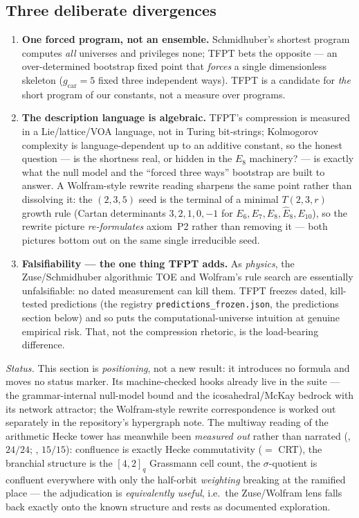 \documentclass[11pt,a4paper]{article}
\begin{document}
\subsection*{Three deliberate divergences}
\begin{enumerate}[leftmargin=1.6em,itemsep=2pt,topsep=2pt,label=\textbf{(\Alph*)}]
\item \textbf{One forced program, not an ensemble.} Schmidhuber's shortest program
      computes \emph{all} universes and privileges none; TFPT bets the opposite --- an
      over-determined bootstrap fixed point that \emph{forces} a single dimensionless
      skeleton ($g_{\mathrm{car}}{=}5$ fixed three independent ways). TFPT is a candidate
      for \emph{the} short program of our constants, not a measure over programs.
\item \textbf{The description language is algebraic.} TFPT's compression is measured in a
      Lie/lattice/VOA language, not in Turing bit-strings; Kolmogorov complexity is
      language-dependent up to an additive constant, so the honest question --- is the
      shortness real, or hidden in the $E_8$ machinery? --- is exactly what the null model
      and the ``forced three ways'' bootstrap are built to answer. A Wolfram-style rewrite
      reading sharpens the same point rather than dissolving it: the $(2,3,5)$ seed is the
      terminal of a minimal $T(2,3,r)$ growth rule (Cartan determinants $3,2,1,0,-1$ for
      $E_6,E_7,E_8,\hat E_8,E_{10}$), so the rewrite picture \emph{re-formulates}
      axiom~P2 rather than removing it --- both pictures bottom out on the same single
      irreducible seed.
\item \textbf{Falsifiability --- the one thing TFPT adds.} As \emph{physics}, the
      Zuse/Schmidhuber algorithmic TOE and Wolfram's rule search are essentially
      unfalsifiable: no dated measurement can kill them. TFPT freezes dated, kill-tested
      predictions (the registry \texttt{predictions\_frozen.json}, the predictions section
      below) and so puts the computational-universe intuition at genuine empirical risk.
      That, not the compression rhetoric, is the load-bearing difference.
\end{enumerate}

\noindent\emph{Status.} This section is \emph{positioning}, not a new result: it
introduces no formula and moves no status marker. Its machine-checked hooks already live
in the suite --- the grammar-internal null-model bound and the icosahedral/McKay bedrock
with its network attractor; the Wolfram-style rewrite correspondence is worked out
separately in the repository's hypergraph note.  The multiway reading of the arithmetic
Hecke tower has meanwhile been \emph{measured out} rather than narrated
(, $24/24$;
, $15/15$): confluence is exactly
Hecke commutativity ($=$ CRT), the branchial structure is the $[4,2]_q$ Grassmann cell
count, the $\sigma$-quotient is confluent everywhere with only the half-orbit
\emph{weighting} breaking at the ramified place --- the adjudication is
\emph{equivalently useful}, i.e.\ the Zuse/Wolfram lens falls back exactly onto the known
structure and rests as documented exploration.
\end{document}
